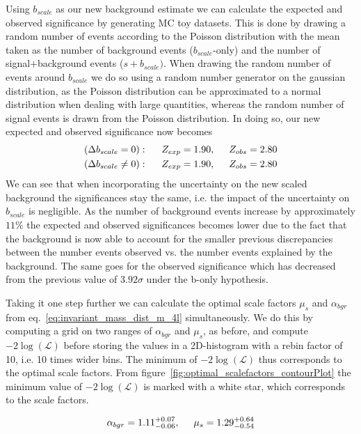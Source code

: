 \documentclass[12pt,a4paper]{amsart}
\begin{document}
Using $b_{scale}$ as our new background estimate we can calculate the expected and observed significance by generating MC toy datasets. This is done by drawing a random number of events according to the Poisson distribution with the mean taken as the number of background events ($b_{scale}$-only) and the number of signal+background events ($s+b_{scale})$. When drawing the random number of events around $b_{scale}$ we do so using a random number generator on the gaussian distribution, as the Poisson distribution can be approximated to a normal distribution when dealing with large quantities, whereas the random number of signal events is drawn from the Poisson distribution. In doing so, our new expected and observed significance now becomes
\begin{align*}
&(\Delta b_{scale} = 0): \hspace{.5cm} Z_{exp} = 1.90,\hspace{.5cm} Z_{obs} = 2.80 \\
&(\Delta b_{scale} \neq 0): \hspace{.5cm} Z_{exp} = 1.90,\hspace{.5cm} Z_{obs} = 2.80 \\
\end{align*}
We can see that when incorporating the uncertainty on the new scaled background the significances stay the same, i.e. the impact of the uncertainty on $b_{scale}$ is negligible. As the number of background events increase by approximately $11\%$ the expected and observed significances becomes lower due to the fact that the background is now able to account for the smaller previous discrepancies between the number events observed vs. the number events explained by the background. The same goes for the observed significance which has decreased from the previous value of $3.92\sigma$ under the b-only hypothesis.

Taking it one step further we can calculate the optimal scale factors $\mu_s$ and $\alpha_{bgr}$ from eq.~\eqref{eq:invariant_mass_dist_m_4l} simultaneously. We do this by computing a grid on two ranges of $\alpha_{bgr}$ and $\mu_s$, as before, and compute $-2\log(\mathcal{L})$ before storing the values in a 2D-histogram with a rebin factor of 10, i.e. 10 times wider bins. The minimum of $-2\log(\mathcal{L})$ thus corresponds to the optimal scale factors. From figure~\ref{fig:optimal_scalefactors_contourPlot} the minimum value of $-2\log(\mathcal{L})$ is marked with a white star, which corresponds to the scale factors.

\begin{align*}
\alpha_{bgr} = 1.11^{+0.07}_{-0.06}, \hspace{.5cm} \mu_s = 1.29^{+0.64}_{-0.54}
\end{align*}
\end{document}
